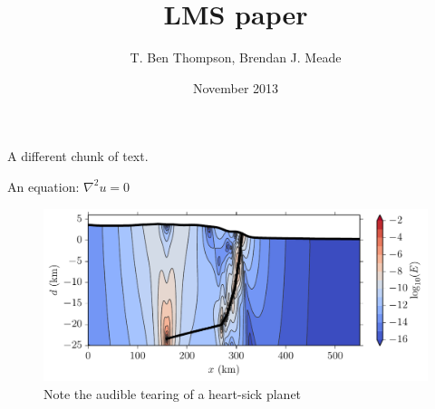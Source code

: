 \documentclass{article}
\title{LMS paper}
\author{T. Ben Thompson, Brendan J. Meade}
\date{November 2013}
\begin{document}
\maketitle

A different chunk of text.

An equation:
$\nabla^2 u = 0$

\begin{figure}[h!]
  \centering
     \includegraphics[width=5in]{figs/log_energy_density.pdf}
   \caption{Note the audible tearing of a heart-sick planet}
\end{figure}
\end{document}
